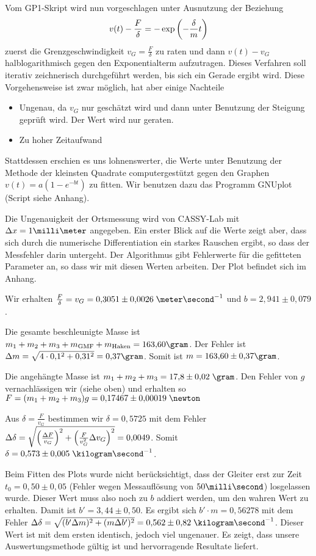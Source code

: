 \documentclass[a4paper,german,12pt,smallheadings]{scrartcl}
\begin{document}
Vom GP1-Skript wird nun vorgeschlagen unter Ausnutzung der Beziehung
\begin{equation} v(t) - \frac{F}{\delta} = -\exp \del{- \frac{\delta}{m} t}
\end{equation} zuerst die Grenzgeschwindigkeit $v_G = \frac{F}{\delta}$ zu
raten und dann $v(t) - v_G$ halblogarithmisch gegen den Exponentialterm
aufzutragen. Dieses Verfahren soll iterativ zeichnerisch durchgeführt werden,
bis sich ein Gerade ergibt wird. Diese Vorgehensweise ist zwar möglich, hat
aber einige Nachteile
\begin{itemize}
  \item Ungenau, da $v_G$ nur geschätzt wird und dann unter Benutzung der
    Steigung geprüft wird. Der Wert wird nur geraten.
  \item Zu hoher Zeitaufwand
\end{itemize}

Stattdessen erschien es uns lohnenswerter, die Werte unter Benutzung der
Methode der kleinsten Quadrate computergestützt gegen den Graphen $v(t) = a (1
- e^{-bt})$ zu fitten. Wir benutzen dazu das Programm GNUplot (Script siehe
Anhang).

Die Ungenauigkeit der Ortsmessung wird von CASSY-Lab mit $\Delta x = 1
\milli\meter$ angegeben. Ein erster Blick auf die Werte zeigt aber, dass sich
durch die numerische Differentiation ein starkes Rauschen ergibt, so dass der
Messfehler darin untergeht. Der Algorithmus gibt Fehlerwerte für die gefitteten
Parameter an, so dass wir mit diesen Werten arbeiten. Der Plot befindet sich im
Anhang.

Wir erhalten $\frac{F}{\delta} = v_G = 0{,}3051\pm0{,}0026
\;\meter\second^{-1}$ und $b = 2{,}941\pm0{,}079$.

Die gesamte beschleunigte Masse ist $m_1 + m_2 + m_3 + m_\text{GMF} +
m_\text{Haken} = 163{,}60 \gram$. Der Fehler ist $\Delta m = \sqrt{4 \cdot
0{,}1^2 + 0{,}31^2} = 0{,}37 \gram$. Somit ist $m = 163{,}60 \pm 0{,}37 \gram$.

Die angehängte Masse ist $m_1 + m_2 + m_3 = 17{,}8 \pm 0{,}02 \;\gram$. Den
Fehler von $g$ vernachlässigen wir (siehe oben) und erhalten so $F = (m_1 + m_2
+ m_3) g = 0{,}17467\pm 0{,}00019 \;\newton$

Aus $\delta = \frac{F}{v_G}$ bestimmen wir $\delta = 0{,}5725$ mit dem Fehler
$\Delta \delta = \sqrt{\del{\frac{\Delta F}{v_G}}^2 + \del{\frac{F}{v_G^2}
\Delta v_G}^2} = 0{,}0049$. Somit $\delta =  0{,}573\pm0{,}005 \;
\kilogram\second^{-1}$.

Beim Fitten des Plots wurde nicht berücksichtigt, dass der Gleiter erst zur
Zeit $t_0 = 0{,}50 \pm 0{,}05$ (Fehler wegen Messauflösung von $50
\milli\second$) losgelassen wurde. Dieser Wert muss also noch zu $b$ addiert
werden, um den wahren Wert zu erhalten. Damit ist $b' = 3{,}44 \pm 0{,}50$. Es
ergibt sich $b' \cdot m = 0{,}56278$ mit dem Fehler $\Delta \delta = \sqrt{(b'
\Delta m)^2 + (m \Delta b')^2} = 0{,}562\pm0{,}82 \; \kilogram\second^{-1}$.
Dieser Wert ist mit dem ersten identisch, jedoch viel ungenauer. Es zeigt, dass
unsere Auswertungsmethode gültig ist und hervorragende Resultate liefert.
\end{document}
